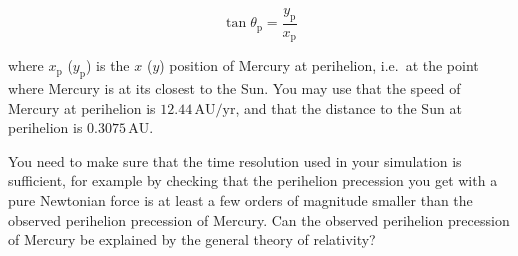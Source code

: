 \documentclass[%
oneside,                 %
final,                   %
10pt]{article}
\begin{document}
\[
\tan \theta_\mathrm{p} = \frac{y_\mathrm{p}}{x_\mathrm{p}}
\]

where $x_\mathrm{p}$ ($y_\mathrm{p}$) is the $x$ ($y$) position of
Mercury at perihelion, i.e.~at the point where Mercury is at its
closest to the Sun. You may use that the speed of Mercury at
perihelion is $12.44\,\mathrm{AU}/\mathrm{yr}$, and that the distance
to the Sun at perihelion is $0.3075\,\mathrm{AU}$.

You need to make
sure that the time resolution used in your simulation is sufficient,
for example by checking that the perihelion precession you get with a
pure Newtonian force is at least a few orders of magnitude smaller
than the observed perihelion precession of Mercury. Can the observed
perihelion precession of Mercury be explained by the general theory of
relativity?


\end{document}
